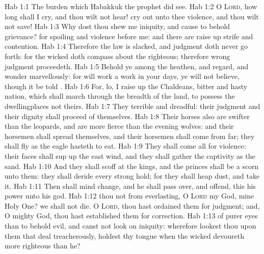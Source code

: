 \vs Hab 1:1 The burden which Habakkuk the prophet did see.
\vs Hab 1:2 O \textsc{Lord}, how long shall I cry, and thou wilt not hear!  cry out unto thee  violence, and thou wilt not save!
\vs Hab 1:3 Why dost thou shew me iniquity, and cause  to behold grievance? for spoiling and violence  before me: and there are  raise up strife and contention.
\vs Hab 1:4 Therefore the law is slacked, and judgment doth never go forth: for the wicked doth compass about the righteous; therefore wrong judgment proceedeth.
\vs Hab 1:5 Behold ye among the heathen, and regard, and wonder marvellously: for  will work a work in your days,  ye will not believe, though it be told .
\vs Hab 1:6 For, lo, I raise up the Chaldeans,  bitter and hasty nation, which shall march through the breadth of the land, to possess the dwellingplaces  not theirs.
\vs Hab 1:7 They  terrible and dreadful: their judgment and their dignity shall proceed of themselves.
\vs Hab 1:8 Their horses also are swifter than the leopards, and are more fierce than the evening wolves: and their horsemen shall spread themselves, and their horsemen shall come from far; they shall fly as the eagle  hasteth to eat.
\vs Hab 1:9 They shall come all for violence: their faces shall sup up  the east wind, and they shall gather the captivity as the sand.
\vs Hab 1:10 And they shall scoff at the kings, and the princes shall be a scorn unto them: they shall deride every strong hold; for they shall heap dust, and take it.
\vs Hab 1:11 Then shall  mind change, and he shall pass over, and offend,  this his power unto his god.
\vs Hab 1:12  thou not from everlasting, O \textsc{Lord} my God, mine Holy One? we shall not die. O \textsc{Lord}, thou hast ordained them for judgment; and, O mighty God, thou hast established them for correction.
\vs Hab 1:13  of purer eyes than to behold evil, and canst not look on iniquity: wherefore lookest thou upon them that deal treacherously,  holdest thy tongue when the wicked devoureth  more righteous than he?
